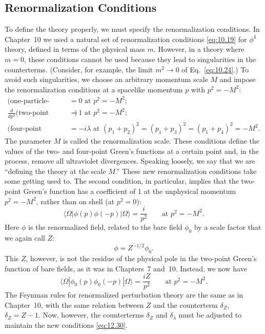 \subsection{Renormalization Conditions}

To define the theory properly, we must specify the renormalization
conditions.  In Chapter~10 we used a natural set of renormalization
conditions \eqref{eq:10.19} for $\phi^4$ theory, defined in terms of the
physical mass $m$.  However, in a theory where $m = 0$, these conditions
cannot be used because they lead to singularities in the counterterms.
(Consider, for example, the limit $m^2\to 0$ of Eq.~\eqref{eq:10.24}.)  To
avoid such singularities, we choose an arbitrary momentum scale $M$ and
impose the renormalization conditions at a spacelike momentum $p$ with
$p^2 = -M^2$:
\begin{equation}
  \begin{aligned}
    \text{(one-particle-irreducible two-point function)} &= 0
      \text{ at } p^2 = -M^2;\\
    \frac{d}{dp^2}\bigl( \text{two-point function} \bigr) &= 1
      \text{ at } p^2 = -M^2;\\
    \text{(four-point function)} &= -i\lambda
      \text{ at } (p_1+p_2)^2 = (p_1+p_3)^2 = (p_1+p_4)^2 = -M^2 .
  \end{aligned}
  \label{eq:12.30}
\end{equation}
The parameter $M$ is called the renormalization scale.  These conditions
define the values of the two- and four-point Green's functions at a certain
point and, in the process, remove all ultraviolet divergences.  Speaking
loosely, we say that we are ``defining the theory at the scale $M$.''  These
new renormalization conditions take some getting used to.  The second
condition, in particular, implies that the two-point Green's function has a
coefficient of 1 at the unphysical momentum $p^2 = -M^2$, rather than on
shell (at $p^2 = 0$):
\begin{equation}
  \langle\Omega|\phi(p)\phi(-p)|\Omega\rangle = \frac{i}{p^2}
  \qquad\text{at } p^2 = -M^2 .
\end{equation}
Here $\phi$ is the renormalized field, related to the bare field $\phi_0$ by a
scale factor that we again call $Z$:
\begin{equation}
  \phi = Z^{-1/2}\phi_0 .
  \label{eq:12.31}
\end{equation}
This $Z$, however, is not the residue of the physical pole in the two-point
Green's function of bare fields, as it was in Chapters~7 and~10.  Instead, we
now have
\begin{equation}
  \langle\Omega|\phi_0(p)\phi_0(-p)|\Omega\rangle = \frac{iZ}{p^2}
  \qquad\text{at } p^2 = -M^2 .
\end{equation}
The Feynman rules for renormalized perturbation theory are the same as in
Chapter~10, with the same relation between $Z$ and the counterterm
$\delta_Z$, $\delta_Z = Z - 1$.  Now, however, the counterterms $\delta_Z$ and
$\delta_\lambda$ must be adjusted to maintain the new conditions
\eqref{eq:12.30}.

